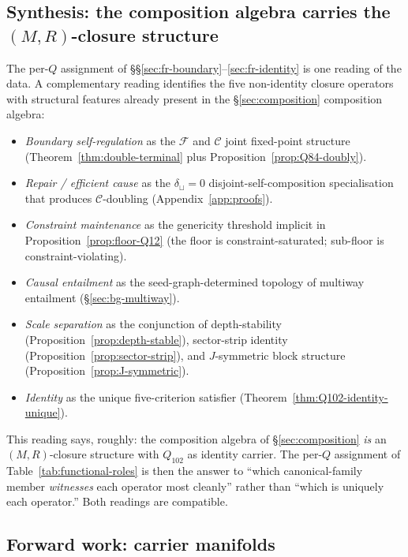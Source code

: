 \documentclass[12pt,a4paper]{article}
\theoremstyle{definition}
\theoremstyle{remark}
\newcommand{\Ccls}{\mathcal{C}}             %
\newcommand{\Fcls}{\mathcal{F}}             %
\begin{document}
\subsection{Synthesis: the composition algebra carries the
$(M,R)$-closure structure}\label{sec:fr-synthesis}

The per-$Q$ assignment of \S\S\ref{sec:fr-boundary}--\ref{sec:fr-identity}
is one reading of the data. A complementary reading identifies the
five non-identity closure operators with structural features already
present in the \S\ref{sec:composition} composition algebra:

\begin{itemize}\setlength\itemsep{0pt}
\item \emph{Boundary self-regulation} as the $\Fcls$ and $\Ccls$
joint fixed-point structure (Theorem~\ref{thm:double-terminal} plus
Proposition~\ref{prop:Q84-doubly}).
\item \emph{Repair / efficient cause} as the $\delta_\sqcup = 0$
disjoint-self-composition specialisation that produces
$\Ccls$-doubling (Appendix~\ref{app:proofs}).
\item \emph{Constraint maintenance} as the genericity threshold
implicit in Proposition~\ref{prop:floor-Q12} (the floor is
constraint-saturated; sub-floor is constraint-violating).
\item \emph{Causal entailment} as the seed-graph-determined topology
of multiway entailment (\S\ref{sec:bg-multiway}).
\item \emph{Scale separation} as the conjunction of depth-stability
(Proposition~\ref{prop:depth-stable}), sector-strip identity
(Proposition~\ref{prop:sector-strip}), and $J$-symmetric block
structure (Proposition~\ref{prop:J-symmetric}).
\item \emph{Identity} as the unique five-criterion satisfier
(Theorem~\ref{thm:Q102-identity-unique}).
\end{itemize}

This reading says, roughly: the composition algebra of
\S\ref{sec:composition} \emph{is} an $(M,R)$-closure structure with
$Q_{102}$ as identity carrier. The per-$Q$ assignment of
Table~\ref{tab:functional-roles} is then the answer to ``which
canonical-family member \emph{witnesses} each operator most cleanly''
rather than ``which is uniquely each operator.'' Both readings are
compatible.

\subsection{Forward work: carrier manifolds}\label{sec:fr-carrier}
\end{document}
